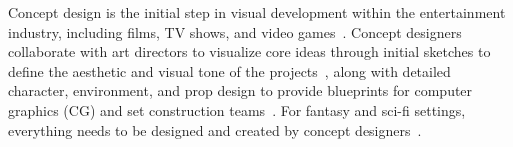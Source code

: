 

Concept design is the initial step in visual development within the entertainment industry, including films, TV shows, and video games~\cite{adobe2020, artofgame2008, bigbadWorld2015, randomguidebook2023, gameworkshop2018, levelup2014}.
Concept designers collaborate with art directors to visualize core ideas through initial sketches to
define the aesthetic and visual tone of the projects~\cite{artofgame2008}, along with detailed character, environment, and prop design to provide blueprints for computer graphics (CG) and set construction teams~\cite{gameworkshop2018, levelup2014}.
For fantasy and sci-fi settings, everything needs to be designed and created by concept designers~\cite{adobe2020}. 

